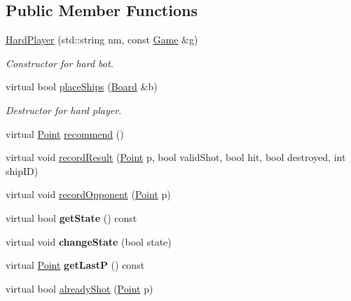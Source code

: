 \subsection*{Public Member Functions}
\begin{DoxyCompactItemize}
\item 
\mbox{\hyperlink{class_hard_player_a40d564084e88021b21324672bf67b169}{Hard\+Player}} (std\+::string nm, const \mbox{\hyperlink{class_game}{Game}} \&g)
\begin{DoxyCompactList}\small\item\em Constructor for hard bot. \end{DoxyCompactList}\item 
virtual bool \mbox{\hyperlink{class_hard_player_a27d0ad3353eba585d7a93d2092036f98}{place\+Ships}} (\mbox{\hyperlink{class_board}{Board}} \&b)
\begin{DoxyCompactList}\small\item\em Destructor for hard player. \end{DoxyCompactList}\item 
virtual \mbox{\hyperlink{class_point}{Point}} \mbox{\hyperlink{class_hard_player_ae1d21325a648a88f1bf51f2b0b286190}{recommend}} ()
\item 
virtual void \mbox{\hyperlink{class_hard_player_aa8977ca3294daf996707bd0ff434d69e}{record\+Result}} (\mbox{\hyperlink{class_point}{Point}} p, bool valid\+Shot, bool hit, bool destroyed, int ship\+ID)
\item 
virtual void \mbox{\hyperlink{class_hard_player_a986175fb966099ac5fe39950e18799ae}{record\+Opponent}} (\mbox{\hyperlink{class_point}{Point}} p)
\item 
\mbox{\label{class_hard_player_a063d9f4071b687339fbc134239771ef3}} 
virtual bool {\bfseries get\+State} () const
\item 
\mbox{\label{class_hard_player_aa25afded558192bd39d8d2c1b2a8209a}} 
virtual void {\bfseries change\+State} (bool state)
\item 
\mbox{\label{class_hard_player_ad86f7d42434ae5526d7a1ca4ea65b51a}} 
virtual \mbox{\hyperlink{class_point}{Point}} {\bfseries get\+LastP} () const
\item 
virtual bool \mbox{\hyperlink{class_hard_player_a8107a94c8db7d5f1023dbeeddfaaedb2}{already\+Shot}} (\mbox{\hyperlink{class_point}{Point}} p)
\item 

\end{DoxyCompactItemize}
